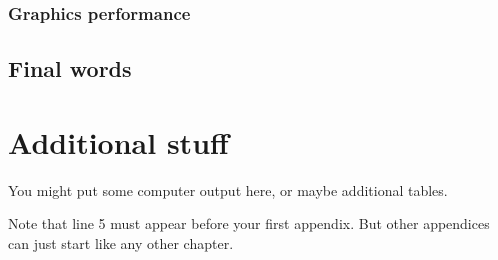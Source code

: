 \documentclass{aucklandthesis}
\begin{document}
\hypertarget{graphics-performance}{%
\subsection{Graphics performance}\label{graphics-performance}}

\hypertarget{final-words}{%
\section{Final words}\label{final-words}}

\appendix

\hypertarget{additional-stuff}{%
\chapter{Additional stuff}\label{additional-stuff}}

You might put some computer output here, or maybe additional tables.

Note that line 5 must appear before your first appendix. But other appendices can just start like any other chapter.

\printbibliography[heading=bibintoc]
\end{document}
